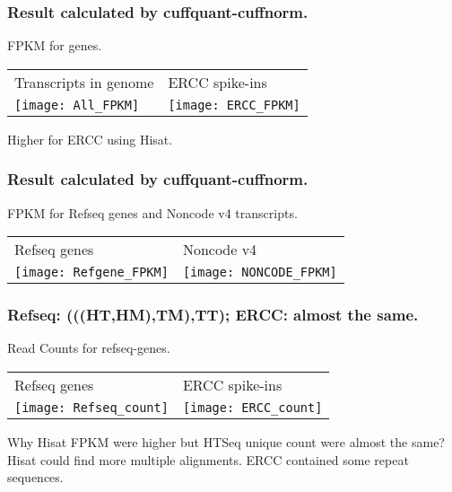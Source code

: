 \begin{frame}[c,fragile]
	\frametitle{ Result calculated by cuffquant-cuffnorm. }
	\begin{block}{ FPKM for genes. }
			\begin{table}
			\centering	
			\begin{tabular}{C{4cm}  C{4cm}}     
				Transcripts in genome		& ERCC spike-ins 	\\
				\texttt{[image: All\_FPKM]}	&  
				\texttt{[image: ERCC\_FPKM]}	\\	
			\end{tabular}	
			\end{table}	
			Higher for ERCC using Hisat.
	\end{block}
\end{frame}

\begin{frame}[c,fragile]
	\frametitle{ Result calculated by cuffquant-cuffnorm. }
	\begin{block}{ FPKM for Refseq genes and Noncode v4 transcripts. }
			\begin{table}
			\centering	
			\begin{tabular}{C{4cm}  C{4cm}}     
				Refseq genes		& Noncode v4 	\\
				\texttt{[image: Refgene\_FPKM]}	&  
				\texttt{[image: NONCODE\_FPKM]}	\\	
			\end{tabular}	
			\end{table}	
	\end{block}
\end{frame}

\begin{frame}[c,fragile]
	\frametitle{ Refseq: (((HT,HM),TM),TT); ERCC: almost the same. }
	\begin{block}{ Read Counts for refseq-genes. }
			\begin{table}
			\centering	
			\begin{tabular}{C{4cm}  C{4cm}}     
				Refseq genes		& ERCC spike-ins 	\\
				\texttt{[image: Refseq\_count]}	&  
				\texttt{[image: ERCC\_count]}	\\	
			\end{tabular}	
			\end{table}	
			\tiny{Why Hisat FPKM were higher but HTSeq unique count were almost the same? \\ \pause
			Hisat could find more multiple alignments. ERCC contained some repeat sequences.}
	\end{block}
\end{frame}


